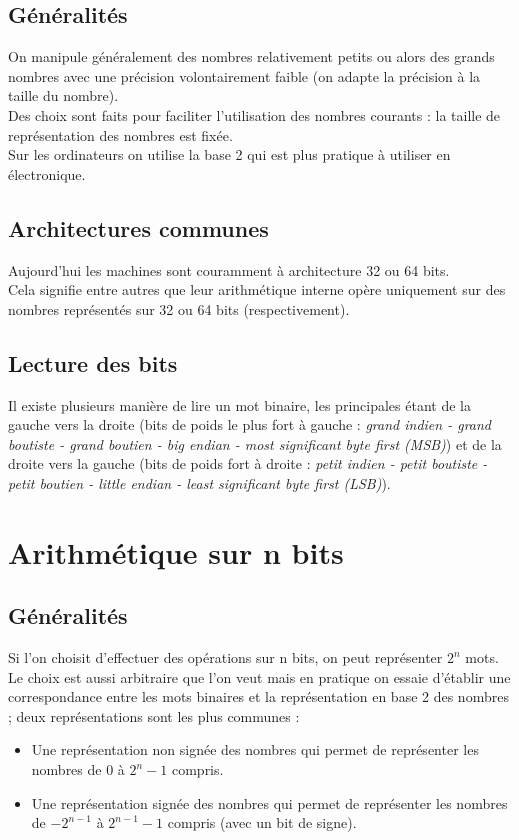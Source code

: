 \documentclass[a4paper,10pt]{book}
\begin{document}
\subsection{Généralités}
On manipule généralement des nombres relativement petits ou alors des grands nombres avec une précision volontairement faible (on adapte la précision à la taille du nombre).\\

Des choix sont faits pour faciliter l’utilisation des nombres courants : la taille de représentation des nombres est fixée.\\

Sur les ordinateurs on utilise la base 2 qui est plus pratique à utiliser en électronique.

\subsection{Architectures communes}
Aujourd’hui les machines sont couramment à architecture 32 ou 64 bits.\\
Cela signifie entre autres que leur arithmétique interne opère uniquement sur des nombres représentés sur 32 ou 64 bits (respectivement).

\subsection{Lecture des bits}
Il existe plusieurs manière de lire un mot binaire, les principales étant de la gauche vers la droite (bits de poids le plus fort à gauche : \textit{grand indien - grand boutiste - grand boutien - big endian - most significant byte first (MSB)}) et de la droite vers la gauche (bits de poids fort à droite : \textit{petit indien - petit boutiste - petit boutien - little endian - least significant byte first (LSB)}).


\section{Arithmétique sur n bits}
\subsection{Généralités}
Si l'on choisit d'effectuer des opérations sur n bits, on peut représenter $2^{n}$ mots. Le choix est aussi arbitraire que l'on veut mais en pratique on essaie d’établir une correspondance entre les mots binaires et la représentation en base 2 des nombres ; deux représentations sont les plus communes :\\
\begin{itemize}
\item Une représentation non signée des nombres qui permet de représenter les nombres de 0 à $2^{n}-1$ compris.
\item Une représentation signée des nombres qui permet de représenter les nombres de $-2^{n-1}$ à $2^{n-1}-1$ compris (avec un bit de signe).
\end{itemize}
\end{document}
